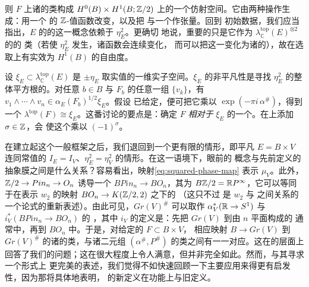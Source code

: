 则 $F$ 上诸\trBraneStructure{}的\trIsomorphism{}类构成
$H^0(B)\times H^1(B;\mathbb{Z}/2)$ 上的一个仿射空间。它由两种操作生成：用一个%
\trLocallyConstant{}的
$\mathbb{Z}$-值函数改变\trGrading，以及把 \trPinStructure{}与一个\trRealLineBundle{}作张量。回到
初始数据，我们应当指出，$E$ 的\trSubbundle{}的\trBraneStructure{}这一概念依赖于 $\eta_E^2$。更确切
地说，重要的只是它作为 $\lambda_{\mathbb{C}}^{\mathrm{top}}(E)^{\otimes 2}$ 的\trTrivialization{}的%
\trHomotopy{}类（若使 $\eta_E^2$ 发生\trDeformation，诸\trSquaredPhase{}函数会连续变化，
而可以把这一变化\trLift{}为诸\trRealValuedPhase{}的\trHomotopy），故在选取上有实效为
$H^1(B)$ 的自由度。
\begin{remark}\label{thm:grading-relative-orientation}
设 $\xi_E\subset\lambda_{\mathbb{C}}^{\mathrm{top}}(E)$ 是 $\pm\eta_E$ 取实值的一维实子空间。$\xi_E$
的非平凡性是寻找 $\eta_E^2$ 的整体平方根的\trObstruction。对任意 $b\in B$ 与 $F_b$
的任意一组\trBasis{} $\{v_k\}$，有 $v_1\wedge\cdots\wedge v_n\in\alpha_E(F_b)^{1/2}\xi_E$。假设%
\trBraneStructure{}已给定，便可把它乘以 $\exp(-\pi i\,\alpha^\#)$，得到一个\trIsomorphism{}
$\lambda^{\mathrm{top}}(F)\cong\xi_E$。这番讨论的要点是：\trGrading{}确定 $F$
\emph{相对于} $\xi_E$ 的一个\trOrientation。在\trGrading{}上添加 $\sigma\in\mathbb{Z}$，会
使这个\trOrientation{}乘以 $(-1)^\sigma$。
\end{remark}
在建立起这个一般框架之后，我们退回到一个更有限的情形，即平凡\trVectorBundle{}
$E=B\times V$ 连同常值的 $I_E=I_V$、$\eta_E^2=\eta_V^2$ 的情形。在这一语境下，眼前的
概念与先前定义的抽象膜之间是什么关系？容易看出，映射\eqref{eq:squared-phase-map}
表示\trMaslovClass{} $\mu_V$。此外，\trShortExactSequence{} $\mathbb{Z}/2\to Pin_n\to O_n$
诱导一个\trFibration{} $BPin_n\to BO_n$，其\trFiber{}为 $B\mathbb{Z}/2=\mathbb{R}P^\infty$，它可以等同
于在表示 $w_2$ 的映射 $BO_n\to K(\mathbb{Z}/2,2)$ 之下\trUniversal\trFibration{}的%
\trPullback（这只不过
是 $w_2$ 与 \trPinStructure{}之间关系的一个\trHomotopy{}论式的重新表述）。由此可见，$Gr(V)^\#$
可以取作\trPullback{} $\alpha_V^*(\mathbb{R}\to S^1)$ 与 $i_V^*(BPin_n\to BO_n)$ 的%
\trFibreProduct，其中 $i_V$ 的定义是：先把 $Gr(V)$ \trEmbedding{}到由 $n$ 平面构成的
通常\trGrassmannian{}中，再\trEmbedding{}到 $BO_n$ 中。于是，对给定的 $F\subset B\times V$，
相应映射 $B\to Gr(V)$ 到 $Gr(V)^\#$ 的诸\trLift{}的\trHomotopy{}类，与诸二元组
$(\alpha^\#,P^\#)$ 的\trIsomorphism{}类之间有一一对应。这在\trHomotopy{}的层面上
回答了我们的问题；这在很大程度上令人满意，但并非完全如此。然而，与其寻求一个形式上
更完美的表述，我们觉得不如快速回顾一下主要应用来得更有启发性，因为那将具体地表明，
\trBraneStructure{}的新定义在功能上与旧定义\trEquivalence。
